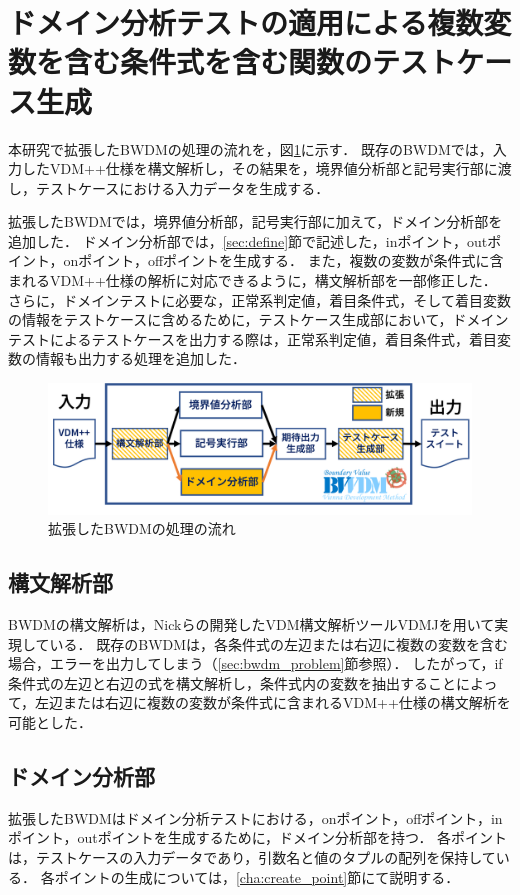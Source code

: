 \documentclass[uplatex, report, a4j, 10pt]{jsbook}
\begin{document}
\section{ドメイン分析テストの適用による複数変数を含む条件式を含む関数のテストケース生成}

本研究で拡張したBWDMの処理の流れを，図\ref{fig:bwdm_structure}に示す．
既存のBWDMでは，入力したVDM++仕様を構文解析し，その結果を，境界値分析部と記号実行部に渡し，テストケースにおける入力データを生成する．

拡張したBWDMでは，境界値分析部，記号実行部に加えて，ドメイン分析部を追加した．
ドメイン分析部では，\ref{sec:define}節で記述した，inポイント，outポイント，onポイント，offポイントを生成する．
また，複数の変数が条件式に含まれるVDM++仕様の解析に対応できるように，構文解析部を一部修正した．
さらに，ドメインテストに必要な，正常系判定値，着目条件式，そして着目変数の情報をテストケースに含めるために，テストケース生成部において，ドメインテストによるテストケースを出力する際は，正常系判定値，着目条件式，着目変数の情報も出力する処理を追加した．

\begin{figure}[t]
  \begin{center}
    \includegraphics[keepaspectratio, width=160mm]{figs/bwdm_structure.png}
    \caption{拡張したBWDMの処理の流れ}
    \label{fig:bwdm_structure}
  \end{center}
\end{figure}

\subsection{構文解析部}
BWDMの構文解析は，Nickらの開発したVDM構文解析ツールVDMJを用いて実現している\cite{vdmj}．
既存のBWDMは，各条件式の左辺または右辺に複数の変数を含む場合，エラーを出力してしまう（\ref{sec:bwdm_problem}節参照）．
したがって，if条件式の左辺と右辺の式を構文解析し，条件式内の変数を抽出することによって，左辺または右辺に複数の変数が条件式に含まれるVDM++仕様の構文解析を可能とした．

\subsection{ドメイン分析部}\label{cha:DomainAnalyzer}
拡張したBWDMはドメイン分析テストにおける，onポイント，offポイント，inポイント，outポイントを生成するために，ドメイン分析部を持つ．
各ポイントは，テストケースの入力データであり，引数名と値のタプルの配列を保持している．
各ポイントの生成については，\ref{cha:create_point}節にて説明する．
\end{document}
